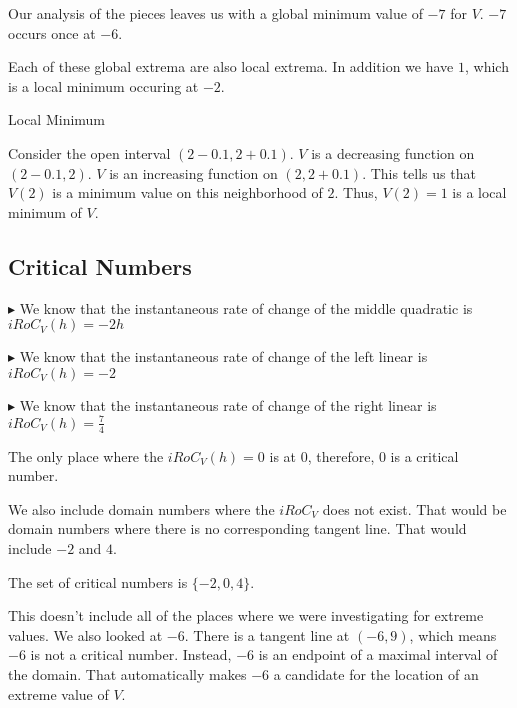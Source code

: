 \documentclass{ximera}
\begin{document}
Our analysis of the pieces leaves us with a global minimum value of $-7$ for $V$. $-7$ occurs once at $-6$.



Each of these global extrema are also local extrema.  In addition we have $1$, which is a local minimum occuring at $-2$.  

\begin{explanation} Local Minimum


Consider the open interval $(2 - 0.1, 2 + 0.1)$. $V$ is a decreasing function on $(2 - 0.1, 2)$. $V$ is an increasing function on $(2, 2 + 0.1)$.  This tells us that $V(2)$ is a minimum value on this neighborhood of $2$.  Thus, $V(2)=1$ is a local minimum of $V$.


\end{explanation}





\subsection{Critical Numbers} 


$\blacktriangleright$ We know that the instantaneous rate of change of the middle quadratic is $iRoC_V(h) = -2h$ 

$\blacktriangleright$ We know that the instantaneous rate of change of the left linear is $iRoC_V(h) = -2$

$\blacktriangleright$ We know that the instantaneous rate of change of the right linear is $iRoC_V(h) = \frac{7}{4}$



The only place where the $iRoC_V(h) = 0$ is at $0$, therefore, $0$ is a critical number.


We also include domain numbers where the $iRoC_V$ does not exist.  That would be domain numbers where there is no corresponding tangent line.  That would include $-2$ and $4$.



The set of critical numbers is $\{ -2, 0, 4 \}$.




This doesn't include all of the places where we were investigating for extreme values. We also looked at $-6$.  There is a tangent line at $(-6, 9)$, which means $-6$ is not a critical number. Instead, $-6$ is an endpoint of a maximal interval of the domain. That automatically makes $-6$ a candidate for the location of an extreme value of $V$.
\end{document}
